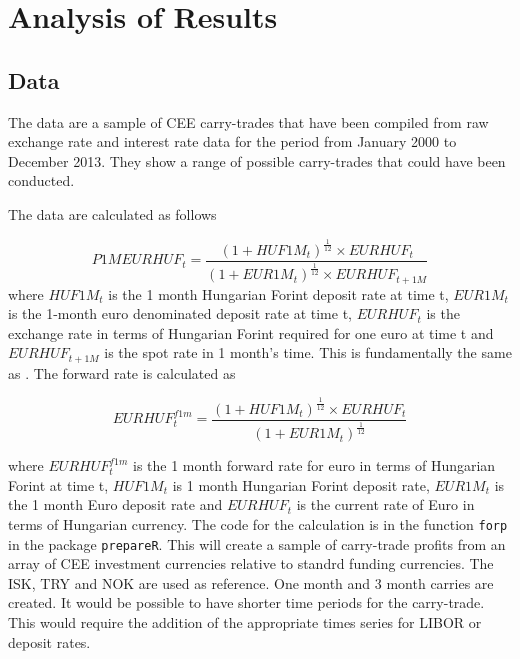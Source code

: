 \documentclass[12pt, a4paper, oneside]{article} %
\begin{document}
\section{Analysis of Results}
\subsection{Data}
The data are a sample of CEE carry-trades that have been compiled from raw exchange rate and interest rate data for the period from January 2000 to December 2013.  They show a range of possible carry-trades that could have been conducted. 

The data are calculated as follows

\begin{equation}\label{eqref:carryprofit}
P1MEURHUF_t = \frac{(1 + HUF1M_t)^{\frac{1}{12}} \times EURHUF_t }{(1 + EUR1M_t)^{\frac{1}{12}} \times EURHUF_{t+1M}}
\end{equation}
where $HUF1M_t$ is the 1 month Hungarian Forint deposit rate at time t, $EUR1M_t$ is the 1-month euro denominated deposit rate at time t, $EURHUF_t$ is the exchange rate in terms of  Hungarian Forint required for one euro at time t and  $EURHUF_{t+1M}$ is the spot rate in 1 month's time.  This is fundamentally the same as \citep{BrunnermeierCarry}. The forward rate is calculated as

\begin{equation}\label{eqref:forward}
EURHUF_t^{f1m} = \frac{(1 + HUF1M_t)^{\frac{1}{12}} \times EURHUF_t }{(1 + EUR1M_t)^{\frac{1}{12}}}
\end{equation}

where  $EURHUF_t^{f1m}$ is the 1 month forward rate for euro in terms of Hungarian Forint at time t, $HUF1M_t$ is 1 month Hungarian Forint deposit rate, $EUR1M_t$ is the 1 month Euro deposit rate and $EURHUF_t$ is the current rate of Euro in terms of Hungarian currency.  The code for the calculation is in the function \lstinline{forp} in the package \lstinline{prepareR}. This will create a sample of carry-trade profits from an array of CEE investment currencies relative to standrd funding currencies.   The ISK, TRY and NOK are used as reference.  One month and 3 month carries are created.  It would be possible to have shorter time periods for the carry-trade.   This would require the addition of the appropriate times series for LIBOR or deposit rates.  

\end{document}
